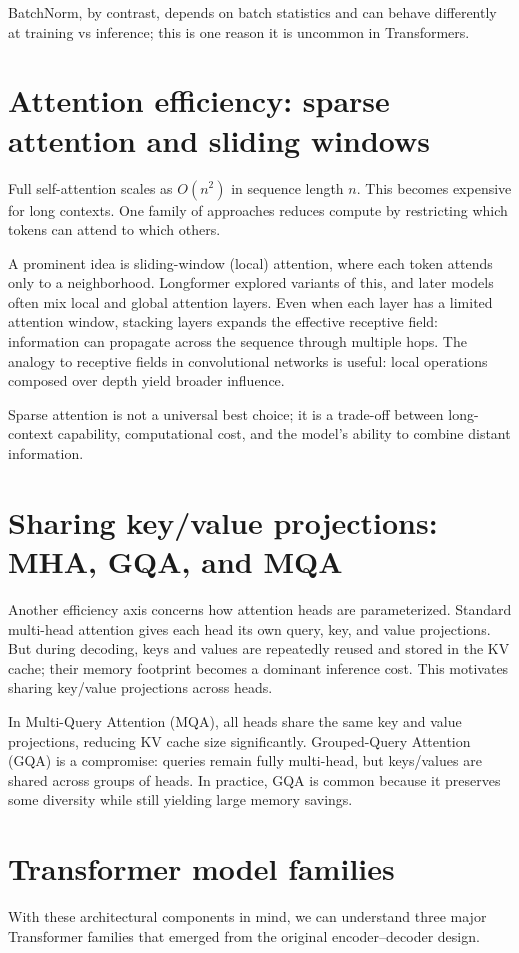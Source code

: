 BatchNorm, by contrast, depends on batch statistics and can behave differently at training vs inference; this is one reason it is uncommon in Transformers.

\section{Attention efficiency: sparse attention and sliding windows}
Full self-attention scales as \(O(n^2)\) in sequence length \(n\). This becomes expensive for long contexts. One family of approaches reduces compute by restricting which tokens can attend to which others.

A prominent idea is sliding-window (local) attention, where each token attends only to a neighborhood. Longformer explored variants of this, and later models often mix local and global attention layers. Even when each layer has a limited attention window, stacking layers expands the effective receptive field: information can propagate across the sequence through multiple hops. The analogy to receptive fields in convolutional networks is useful: local operations composed over depth yield broader influence.

Sparse attention is not a universal best choice; it is a trade-off between long-context capability, computational cost, and the model’s ability to combine distant information.

\section{Sharing key/value projections: MHA, GQA, and MQA}
Another efficiency axis concerns how attention heads are parameterized. Standard multi-head attention gives each head its own query, key, and value projections. But during decoding, keys and values are repeatedly reused and stored in the KV cache; their memory footprint becomes a dominant inference cost. This motivates sharing key/value projections across heads.

In Multi-Query Attention (MQA), all heads share the same key and value projections, reducing KV cache size significantly. Grouped-Query Attention (GQA) is a compromise: queries remain fully multi-head, but keys/values are shared across groups of heads. In practice, GQA is common because it preserves some diversity while still yielding large memory savings.

\section{Transformer model families}
With these architectural components in mind, we can understand three major Transformer families that emerged from the original encoder--decoder design.

